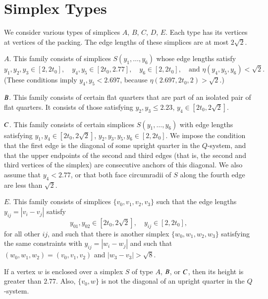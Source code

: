 \section{Simplex Types}%

We consider various types of simplices $A$, $B$, $C$, $D$, $E$.  Each type has
its vertices at vertices of the packing.  The edge lengths of
these simplices are at most $2\sqrt{2}$.

$A$.  This family consists of simplices $S(y_1,\ldots,y_6)$ whose
edge lengths satisfy
    $$
    y_1,y_2,y_3\in[2,2t_0],\quad
    y_4,y_5\in[2t_0,2.77],
    \quad
    y_6\in[2,2t_0],\quad \text{and }
    \eta(y_4,y_5,y_6)<\sqrt{2}.
    $$
(These conditions imply $y_4,y_5<2.697$, because
$\eta(2.697,2t_0,2)>\sqrt2$.)

$B$.  This family consists of certain flat quarters that are
part of an isolated pair of flat quarters. It consists of those
satisfying $y_2,y_3\le 2.23$, $y_4\in[2t_0,2\sqrt{2}]$.

$C$.  This family consists of certain simplices
$S(y_1,\ldots,y_6)$ with edge lengths satisfying
    $y_1,y_4\in[2t_0,2\sqrt{2}]$, $y_2,y_3,y_5,y_6\in[2,2t_0]$.
We impose the condition that the first edge is the diagonal of
some upright quarter in the $Q$-system, and that the upper
endpoints of the second and third edges (that is, the second and
third vertices of the simplex) are consecutive anchors of this
diagonal. We also assume that $y_4< 2.77$, or that both face
circumradii of $S$ along the fourth edge are less than $\sqrt{2}$.


$E$.  This family consists of simplices $\{v_0,v_1,v_2,v_3\}$ such
that 
the edge lengths $y_{ij} = |v_i-v_j|$ satisfy
   $$
   y_{01},y_{02}\in[2t_0,2\sqrt{2}],\quad
   y_{ij}\in [2,2t_0], 
   $$
for all other $ij$, and such that
there is another simplex $\{w_0,w_1,w_2,w_3\}$ satisfying the same
constraints with $y_{ij} = |w_i-w_j|$ and  such that $(w_0,w_1,w_2)=(v_0,v_1,v_2)$
and $|w_3-v_3|>\sqrt8$.

\begin{lemma}
    \label{lemma:2.77}
If a vertex $w$ is enclosed over a simplex $S$ of type $A$, $B$,
or $C$, then its height is greater than $2.77$.  Also, $\{v_0,w\}$
is not the diagonal of an upright quarter in the $Q$-system.
\end{lemma}

